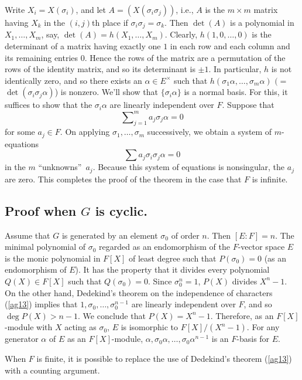 \documentclass[a4paper,11pt,final,openany]{memoir}
\theoremstyle{nonumberplain}
\begin{document}
Write $X_{i}=X(\sigma_{i})$, and let $A=(X(\sigma_{i}\sigma_{j}))$, i.e., $A$
is the $m\times m$ matrix having $X_{k}$ in the $(i,j)$th place if $\sigma
_{i}\sigma_{j}=\sigma_{k}$. Then $\det(A)$ is a polynomial in $X_{1}%
,\ldots,X_{m}$, say, $\det(A)=h(X_{1},\ldots,X_{m})$. Clearly, $h(1,0,\ldots
,0)$ is the determinant of a matrix having exactly one $1$ in each row and
each column and its remaining entries $0$. Hence the rows of the matrix are a
permutation of the rows of the identity matrix, and so its determinant is
$\pm1$. In particular, $h$ is not identically zero, and so there exists an
$\alpha\in E^{\times}$ such that $h(\sigma_{1}\alpha,\ldots,\sigma_{m}\alpha)$
$(=$ $\det(\sigma_{i}\sigma_{j}\alpha)$) is nonzero. We'll show that
$\{\sigma_{i}\alpha\}$ is a normal basis. For this, it suffices to show that
the $\sigma_{i}\alpha$ are linearly independent over $F$. Suppose that
\[
\sum\nolimits_{j=1}^{m}a_{j}\sigma_{j}\alpha=0
\]
for some $a_{j}\in F$. On applying $\sigma_{1},\ldots,\sigma_{m}$
successively, we obtain a system of $m$-equations
\[
\sum a_{j}\sigma_{i}\sigma_{j}\alpha=0
\]
in the $m$ \textquotedblleft unknowns\textquotedblright\ $a_{j}$. Because this
system of equations is nonsingular, the $a_{j}$ are zero. This completes the
proof of the theorem in the case that $F$ is infinite.

\subsection{Proof when $G$ is cyclic.}

Assume that $G$ is generated by an element $\sigma_{0}$ of order $n$. Then
$[E\colon F]=n$. The minimal polynomial of $\sigma_{0}$ regarded as an
endomorphism of the $F$-vector space $E$ is the monic polynomial in $F[X]$ of
least degree such that $P(\sigma_{0})=0$ (as an endomorphism of $E$). It has
the property that it divides every polynomial $Q(X)\in F[X]$ such that
$Q(\sigma_{0})=0$. Since $\sigma_{0}^{n}=1$, $P(X)$ divides $X^{n}-1$. On the
other hand, Dedekind's theorem on the independence of characters (\ref{ag13})
implies that $1,\sigma_{0},\ldots,\sigma_{0}^{n-1}$ are linearly independent
over $F$, and so $\deg P(X)>n-1$. We conclude that $P(X)=X^{n}-1$. Therefore,
as an $F[X]$-module with $X$ acting as $\sigma_{0}$, $E$ is isomorphic to
$F[X]/(X^{n}-1)$. For any generator $\alpha$ of $E$ as an $F[X]$-module,
$\alpha,\sigma_{0}\alpha,\ldots,\sigma_{0}\alpha^{n-1}$ is an $F$-basis for
$E$.

When $F$ is finite, it is possible to replace the use of Dedekind's theorem
(\ref{ag13}) with a counting argument.
\end{document}
